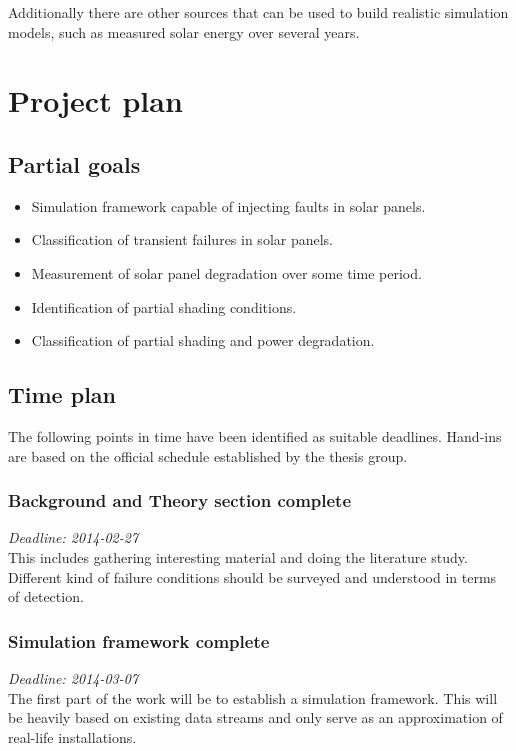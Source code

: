 \documentclass[a4paper,11pt]{article}
\begin{document}
Additionally there are other sources that can be used to build realistic simulation models, such as measured solar energy over several years.

\section*{Project plan}
\subsection*{Partial goals}
\begin{itemize}
\item Simulation framework capable of injecting faults in solar panels.
\item Classification of transient failures in solar panels.
\item Measurement of solar panel degradation over some time period.
\item Identification of partial shading conditions.
\item Classification of partial shading and power degradation.
\end{itemize}

\clearpage
\subsection*{Time plan}
The following points in time have been identified as suitable deadlines.
Hand-ins are based on the official schedule established by the thesis group.

\subsubsection*{Background and Theory section complete}
\noindent
\emph{Deadline: 2014-02-27}\\
\noindent
This includes gathering interesting material and doing the literature study.
Different kind of failure conditions should be surveyed and understood in terms of detection.

\subsubsection*{Simulation framework complete}
\noindent
\emph{Deadline: 2014-03-07}\\
\noindent
The first part of the work will be to establish a simulation framework.
This will be heavily based on existing data streams and only serve as an approximation of real-life installations.
\end{document}
